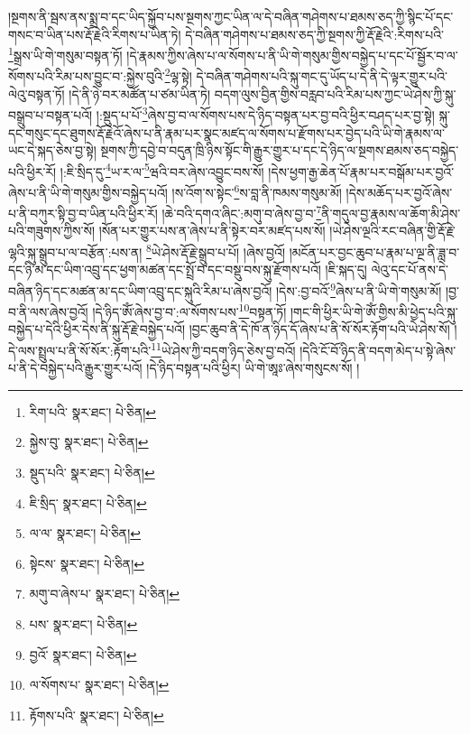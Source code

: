 །སྔགས་ནི་སྦས་ནས་སྨྲ་བ་དང་ཡིད་སྐྱོབ་པས་སྔགས་ཀྱང་ཡིན་ལ་དེ་བཞིན་གཤེགས་པ་ཐམས་ཅད་ཀྱི་སྙིང་པོ་དང་གསང་བ་ཡིན་པས་རྡོ་རྗེའི་རིགས་པ་ཡིན་ཏེ། དེ་བཞིན་གཤེགས་པ་ཐམས་ཅད་ཀྱི་སྔགས་ཀྱི་རྡོ་རྗེའི་:རིགས་པའི་\footnote{རིག་པའི་  སྣར་ཐང་།  པེ་ཅིན། }སྒྲས་ཡི་གེ་གསུམ་བསྟན་ཏོ། །དེ་རྣམས་ཀྱིས་ཞེས་པ་ལ་སོགས་པ་ནི་ཡི་གེ་གསུམ་གྱིས་བསྐྱེད་པ་དང་པོ་སྦྱོར་བ་ལ་སོགས་པའི་རིམ་པས་བྱུང་བ་:སྐྱེས་བུའི་\footnote{སྐྱེས་བུ་  སྣར་ཐང་།  པེ་ཅིན། }ལྷ་སྟེ། དེ་བཞིན་གཤེགས་པའི་སྐུ་གང་དུ་ཡོད་པ་དེ་ནི་དེ་ལྟར་གྱུར་པའི་ལེའུ་བསྟན་ཏོ། །དེ་ནི་ཉེ་བར་མཚོན་པ་ཙམ་ཡིན་ཏེ། བདག་ལུས་བྱིན་གྱིས་བརླབ་པའི་རིམ་པས་ཀྱང་ཡེ་ཤེས་ཀྱི་སྐུ་བསྒྲུབ་པ་བསྟན་པའོ། །:སྡུད་པ་པོ་\footnote{སྡུད་པའི་  སྣར་ཐང་།  པེ་ཅིན། }ཞེས་བྱ་བ་ལ་སོགས་པས་དེ་ཉིད་བསྟན་པར་བྱ་བའི་ཕྱིར་བཤད་པར་བྱ་སྟེ། སྐུ་དང་གསུང་དང་ཐུགས་རྡོ་རྗེའོ་ཞེས་པ་ནི་རྣམ་པར་སྣང་མཛད་ལ་སོགས་པ་རྫོགས་པར་བྱེད་པའི་ཡི་གེ་རྣམས་ལ་ཡང་དེ་སྐད་ཅེས་བྱ་སྟེ། སྔགས་ཀྱི་དབྱེ་བ་བདུན་ཁྲི་ཉིས་སྟོང་གི་རྒྱུར་གྱུར་པ་དང་དེ་ཉིད་ལ་སྔགས་ཐམས་ཅད་བསྐྱེད་པའི་ཕྱིར་རོ། །:ཇི་སྲིད་དུ་\footnote{ཇི་སྲིད་  སྣར་ཐང་།  པེ་ཅིན། }ཡ་ར་ལ་\footnote{ལ་ལ་  སྣར་ཐང་།  པེ་ཅིན། }ཝའི་བར་ཞེས་འབྱུང་བས་སོ། །དེས་ཕྱག་རྒྱ་ཆེན་པོ་རྣམ་པར་བསྒོམ་པར་བྱའོ་ཞེས་པ་ནི་ཡི་གེ་གསུམ་གྱིས་བསྐྱེད་པའོ། །ས་འོག་ས་སྟེང་\footnote{སྟེངས་  སྣར་ཐང་།  པེ་ཅིན། }ས་བླ་ནི་ཁམས་གསུམ་མོ། །དེས་མཆོད་པར་བྱའོ་ཞེས་པ་ནི་བཀུར་སྟི་བྱ་བ་ཡིན་པའི་ཕྱིར་རོ། །ཆེ་བའི་དགའ་ཞིང་:མགུ་བ་ཞེས་བྱ་བ་\footnote{མགུ་བ་ཞེས་པ་  སྣར་ཐང་།  པེ་ཅིན། }ནི་གདུལ་བྱ་རྣམས་ལ་ཆོག་མི་ཤེས་པའི་གཟུགས་ཀྱིས་སོ། །སོན་པར་གྱུར་པས་ན་ཞེས་པ་ནི་སྟེར་བར་མཛད་པས་སོ། །ཡེ་ཤེས་ལྔའི་རང་བཞིན་གྱི་རྡོ་རྗེ་ལྷའི་སྐུ་སྒྲུབ་པ་ལ་བརྩོན་:པས་ན། \footnote{པས་  སྣར་ཐང་།  པེ་ཅིན། }ཡེ་ཤེས་རྡོ་རྗེ་སྒྲུབ་པ་པོ། །ཞེས་བྱའོ། །མངོན་པར་བྱང་ཆུབ་པ་རྣམ་པ་ལྔ་ནི་ཟླ་བ་དང་ཉི་མ་དང་ཡིག་འབྲུ་དང་ཕྱག་མཚན་དང་སྤྲོ་བ་དང་བསྡུ་བས་སྐུ་རྫོགས་པའོ། །ཇི་སྐད་དུ། ལེའུ་དང་པོ་ནས་དེ་བཞིན་ཉིད་དང་མཚན་མ་དང་ཡིག་འབྲུ་དང་སྐུའི་རིམ་པ་ཞེས་བྱའོ། །དེས་:བྱ་བའོ་\footnote{བྱའོ་  སྣར་ཐང་།  པེ་ཅིན། }ཞེས་པ་ནི་ཡི་གེ་གསུམ་མོ། །བྱ་བ་ནི་ལས་ཞེས་བྱའོ། །དེ་ཉིད་ཨོཾ་ཞེས་བྱ་བ་:ལ་སོགས་པས་\footnote{ལ་སོགས་པ་  སྣར་ཐང་།  པེ་ཅིན། }བསྟན་ཏོ། །གང་གི་ཕྱིར་ཡི་གེ་ཨོཾ་གྱིས་མི་ཕྱེད་པའི་སྐུ་བསྐྱེད་པ་དེའི་ཕྱིར་དེས་ནི་སྐུ་རྡོ་རྗེ་བསྐྱེད་པའོ། །བྱང་ཆུབ་ནི་དེ་ཁོ་ན་ཉིད་དོ་ཞེས་པ་ནི་སོ་སོར་རྟོག་པའི་ཡེ་ཤེས་སོ། །དེ་ལས་སྤྲུལ་པ་ནི་སོ་སོར་:རྟོག་པའི་\footnote{རྟོགས་པའི་  སྣར་ཐང་།  པེ་ཅིན། }ཡེ་ཤེས་ཀྱི་བདག་ཉིད་ཅེས་བྱ་བའོ། །དེའི་ངོ་བོ་ཉིད་ནི་བདག་མེད་པ་སྟེ་ཞེས་པ་ནི་དེ་བསྐྱེད་པའི་རྒྱུར་གྱུར་པའོ། །དེ་ཉིད་བསྟན་པའི་ཕྱིར། ཡི་གེ་ཨཱཿ་ཞེས་གསུངས་སོ། །
